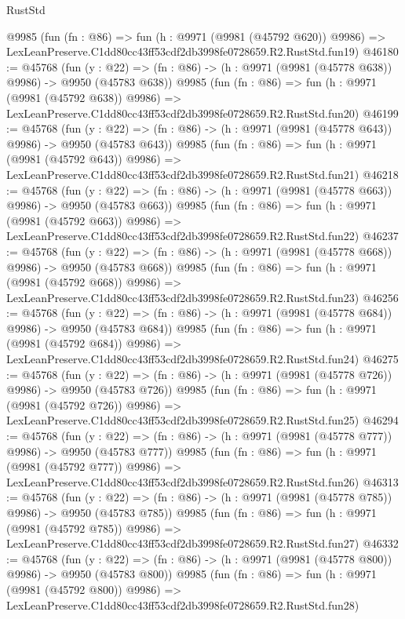 \begin{lexlean}{RustStd}
\begin{coremodule}
    @9985
    (fun (fn : @86) =>
    fun (h : @9971 (@9981 (@45792 @620)) @9986) =>
    LexLeanPreserve.C1dd80cc43ff53cdf2db3998fe0728659.R2.RustStd.fun19)
@46180 := @45768
    (fun (y : @22) => (fn : @86) -> (h : @9971 (@9981 (@45778 @638)) @9986) -> @9950 (@45783 @638))
    @9985
    (fun (fn : @86) =>
    fun (h : @9971 (@9981 (@45792 @638)) @9986) =>
    LexLeanPreserve.C1dd80cc43ff53cdf2db3998fe0728659.R2.RustStd.fun20)
@46199 := @45768
    (fun (y : @22) => (fn : @86) -> (h : @9971 (@9981 (@45778 @643)) @9986) -> @9950 (@45783 @643))
    @9985
    (fun (fn : @86) =>
    fun (h : @9971 (@9981 (@45792 @643)) @9986) =>
    LexLeanPreserve.C1dd80cc43ff53cdf2db3998fe0728659.R2.RustStd.fun21)
@46218 := @45768
    (fun (y : @22) => (fn : @86) -> (h : @9971 (@9981 (@45778 @663)) @9986) -> @9950 (@45783 @663))
    @9985
    (fun (fn : @86) =>
    fun (h : @9971 (@9981 (@45792 @663)) @9986) =>
    LexLeanPreserve.C1dd80cc43ff53cdf2db3998fe0728659.R2.RustStd.fun22)
@46237 := @45768
    (fun (y : @22) => (fn : @86) -> (h : @9971 (@9981 (@45778 @668)) @9986) -> @9950 (@45783 @668))
    @9985
    (fun (fn : @86) =>
    fun (h : @9971 (@9981 (@45792 @668)) @9986) =>
    LexLeanPreserve.C1dd80cc43ff53cdf2db3998fe0728659.R2.RustStd.fun23)
@46256 := @45768
    (fun (y : @22) => (fn : @86) -> (h : @9971 (@9981 (@45778 @684)) @9986) -> @9950 (@45783 @684))
    @9985
    (fun (fn : @86) =>
    fun (h : @9971 (@9981 (@45792 @684)) @9986) =>
    LexLeanPreserve.C1dd80cc43ff53cdf2db3998fe0728659.R2.RustStd.fun24)
@46275 := @45768
    (fun (y : @22) => (fn : @86) -> (h : @9971 (@9981 (@45778 @726)) @9986) -> @9950 (@45783 @726))
    @9985
    (fun (fn : @86) =>
    fun (h : @9971 (@9981 (@45792 @726)) @9986) =>
    LexLeanPreserve.C1dd80cc43ff53cdf2db3998fe0728659.R2.RustStd.fun25)
@46294 := @45768
    (fun (y : @22) => (fn : @86) -> (h : @9971 (@9981 (@45778 @777)) @9986) -> @9950 (@45783 @777))
    @9985
    (fun (fn : @86) =>
    fun (h : @9971 (@9981 (@45792 @777)) @9986) =>
    LexLeanPreserve.C1dd80cc43ff53cdf2db3998fe0728659.R2.RustStd.fun26)
@46313 := @45768
    (fun (y : @22) => (fn : @86) -> (h : @9971 (@9981 (@45778 @785)) @9986) -> @9950 (@45783 @785))
    @9985
    (fun (fn : @86) =>
    fun (h : @9971 (@9981 (@45792 @785)) @9986) =>
    LexLeanPreserve.C1dd80cc43ff53cdf2db3998fe0728659.R2.RustStd.fun27)
@46332 := @45768
    (fun (y : @22) => (fn : @86) -> (h : @9971 (@9981 (@45778 @800)) @9986) -> @9950 (@45783 @800))
    @9985
    (fun (fn : @86) =>
    fun (h : @9971 (@9981 (@45792 @800)) @9986) =>
    LexLeanPreserve.C1dd80cc43ff53cdf2db3998fe0728659.R2.RustStd.fun28)

\end{coremodule}
\end{lexlean}
